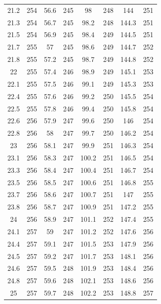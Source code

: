 \documentclass[12pt]{ctexart}
\numberwithin{equation}{section}
\begin{document}
\begin{longtable}{cc|cc|cc|cc}
21.2  &  254  &  56.6  &  245  &  98  &  248  &  144  &  251  \\
21.3  &  254  &  56.7  &  245  &  98.2  &  248  &  144.3  &  251  \\
21.5  &  254  &  56.9  &  245  &  98.4  &  249  &  144.5  &  251  \\
21.7  &  255  &  57  &  245  &  98.6  &  249  &  144.7  &  252  \\
21.8  &  255  &  57.2  &  245  &  98.7  &  249  &  144.8  &  252  \\
22  &  255  &  57.4  &  246  &  98.9  &  249  &  145.1  &  253  \\
22.1  &  255  &  57.5  &  246  &  99.1  &  249  &  145.3  &  253  \\
22.4  &  255  &  57.6  &  246  &  99.2  &  250  &  145.5  &  254  \\
22.5  &  255  &  57.8  &  246  &  99.4  &  250  &  145.8  &  254  \\
22.6  &  256  &  57.9  &  247  &  99.6  &  250  &  146  &  254  \\
22.8  &  256  &  58  &  247  &  99.7  &  250  &  146.2  &  254  \\
23  &  256  &  58.1  &  247  &  99.9  &  251  &  146.3  &  254  \\
23.1  &  256  &  58.3  &  247  &  100.2  &  251  &  146.5  &  254  \\
23.3  &  256  &  58.4  &  247  &  100.4  &  251  &  146.7  &  254  \\
23.5  &  256  &  58.5  &  247  &  100.6  &  251  &  146.8  &  255  \\
23.7  &  256  &  58.6  &  247  &  100.7  &  251  &  147  &  255  \\
23.8  &  256  &  58.7  &  247  &  100.9  &  251  &  147.2  &  255  \\
24  &  256  &  58.9  &  247  &  101.1  &  252  &  147.4  &  255  \\
24.1  &  257  &  59  &  247  &  101.2  &  252  &  147.6  &  256  \\
24.4  &  257  &  59.1  &  247  &  101.5  &  253  &  147.9  &  256  \\
24.5  &  257  &  59.2  &  247  &  101.7  &  253  &  148.1  &  256  \\
24.6  &  257  &  59.5  &  248  &  101.9  &  253  &  148.4  &  256  \\
24.8  &  257  &  59.6  &  248  &  102.1  &  253  &  148.6  &  256  \\
25  &  257  &  59.7  &  248  &  102.2  &  253  &  148.8  &  257  \\

\end{longtable}
\end{document}
